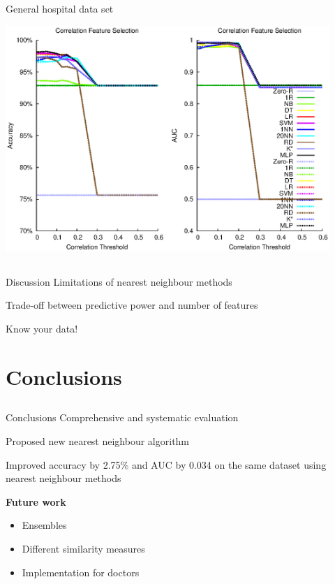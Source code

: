 \documentclass[compress]{beamer}
\begin{document}
\subsection{}
\begin{frame}{General hospital data set}
\begin{center}
\includegraphics[width=0.92\textwidth]{pt-corr.eps}
\end{center}
\end{frame}

\subsection{}
\begin{frame}{Discussion}
Limitations of nearest neighbour methods

\vspace{0.5cm}
Trade-off between predictive power and number of features

\vspace{0.5cm}
Know your data!
\end{frame}

\section{Conclusions}
\subsection{}
\begin{frame}{Conclusions}
Comprehensive and systematic evaluation

\vspace{0.5cm}
Proposed new nearest neighbour algorithm

\vspace{0.5cm}
Improved accuracy by 2.75\% and AUC by 0.034 on the same dataset using nearest neighbour methods

\pause
\vspace{0.5cm}
\textbf{Future work}
\begin{itemize}
\item Ensembles
\item Different similarity measures
\item Implementation for doctors
\end{itemize}
\end{frame}
\end{document}
